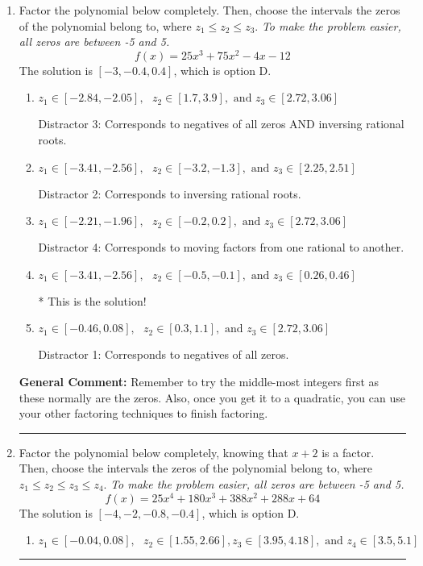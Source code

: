 \documentclass{extbook}[14pt]
\newcommand{\litem}[1]{\item #1

\rule{\textwidth}{0.4pt}}
\begin{document}
\begin{enumerate}\litem{
Factor the polynomial below completely. Then, choose the intervals the zeros of the polynomial belong to, where $z_1 \leq z_2 \leq z_3$. \textit{To make the problem easier, all zeros are between -5 and 5.}
\[ f(x) = 25x^{3} +75 x^{2} -4 x -12 \]The solution is \( [-3, -0.4, 0.4] \), which is option D.\begin{enumerate}[label=\Alph*.]
\item \( z_1 \in [-2.84, -2.05], \text{   }  z_2 \in [1.7, 3.9], \text{   and   } z_3 \in [2.72, 3.06] \)

 Distractor 3: Corresponds to negatives of all zeros AND inversing rational roots.
\item \( z_1 \in [-3.41, -2.56], \text{   }  z_2 \in [-3.2, -1.3], \text{   and   } z_3 \in [2.25, 2.51] \)

 Distractor 2: Corresponds to inversing rational roots.
\item \( z_1 \in [-2.21, -1.96], \text{   }  z_2 \in [-0.2, 0.2], \text{   and   } z_3 \in [2.72, 3.06] \)

 Distractor 4: Corresponds to moving factors from one rational to another.
\item \( z_1 \in [-3.41, -2.56], \text{   }  z_2 \in [-0.5, -0.1], \text{   and   } z_3 \in [0.26, 0.46] \)

* This is the solution!
\item \( z_1 \in [-0.46, 0.08], \text{   }  z_2 \in [0.3, 1.1], \text{   and   } z_3 \in [2.72, 3.06] \)

 Distractor 1: Corresponds to negatives of all zeros.
\end{enumerate}

\textbf{General Comment:} Remember to try the middle-most integers first as these normally are the zeros. Also, once you get it to a quadratic, you can use your other factoring techniques to finish factoring.
}
\litem{
Factor the polynomial below completely, knowing that $x+2$ is a factor. Then, choose the intervals the zeros of the polynomial belong to, where $z_1 \leq z_2 \leq z_3 \leq z_4$. \textit{To make the problem easier, all zeros are between -5 and 5.}
\[ f(x) = 25x^{4} +180 x^{3} +388 x^{2} +288 x + 64 \]The solution is \( [-4, -2, -0.8, -0.4] \), which is option D.\begin{enumerate}[label=\Alph*.]
\item \( z_1 \in [-0.04, 0.08], \text{   }  z_2 \in [1.55, 2.66], z_3 \in [3.95, 4.18], \text{   and   } z_4 \in [3.5, 5.1] \)


\end{enumerate}}
\end{enumerate}
\end{document}
